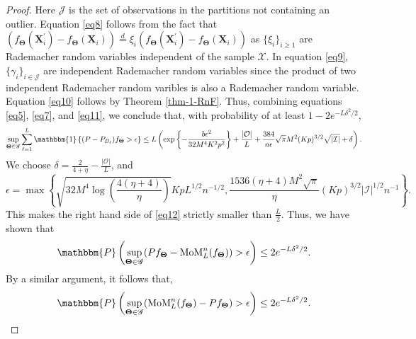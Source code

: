 \documentclass[11pt]{article}
\newcommand{\bX}{\boldsymbol{X}}
\newcommand{\bTheta}{\boldsymbol{\Theta}}
\newcommand{\I}{\mathcal{I}}
\newcommand{\J}{\mathcal{J}}
\newcommand{\cO}{\mathcal{O}}
\newcommand{\sP}{\mathbbm{P}}
\newcommand{\one}{\mathbbm{1}}
\begin{document}
\begin{proof}
Here $\J$ is the set of observations in the partitions not containing an outlier. Equation \eqref{eq8} follows from the fact that  $(f_{\bTheta}(\bX_i^\prime)-f_{\bTheta}(\bX_i)) \overset{d}{=} \xi_i(f_{\bTheta}(\bX_i^\prime)-f_{\bTheta}(\bX_i))$ as $\{\xi_i\}_{i\ge 1}$ are Rademacher random variables independent of the sample $\mathcal{X}$. In equation \eqref{eq9}, $\{\gamma_i\}_{i \in \mathcal{J}}$ are independent Rademacher random variables since the product of two independent Rademacher random varibles is also a Rademacher random variable. Equation \eqref{eq10} follows by Theorem \ref{thm-1-RnF}.
Thus, combining equations \eqref{eq5}, \eqref{eq7}, and \eqref{eq11}, we conclude that,  with probability of at least $1-2e^{-L \delta^2/2}$, 
\begin{equation}
    \sup_{\bTheta \in \mathscr{G}}\sum_{\ell = 1}^L \one\left\{(P-P_{B_\ell})f_{\bTheta} > \epsilon\right\} \le  L \left( \exp\left\{-\frac{b \epsilon^2}{32  M^4 K^2 p^2}\right\}+ \frac{|\cO|}{L} + \frac{384}{n \epsilon}  \sqrt{\pi} M^2  (Kp)^{3/2} \sqrt{|\I|} + \delta\right). \label{eq12}
\end{equation}
We choose $\delta = \frac{2}{4+\eta} - \frac{|\cO|}{L}$, and $$\epsilon = \max\left\{\sqrt{32  M^4 \log\left(\frac{4(\eta+4)}{\eta}\right)}KpL^{1/2}n^{-1/2}, \frac{1536(\eta+4)  M^2 \sqrt{\pi}}{\eta} (Kp)^{3/2} |\I|^{1/2}n^{-1}\right\}.$$ This makes the right hand side of \eqref{eq12} strictly smaller than $\frac{L}{2}$.
Thus, we have shown that 
\begin{align*}
     \sP\left( \sup_{\bTheta \in \mathscr{G}} (Pf_{\bTheta} - \text{MoM}^n_L (f_{\bTheta}))> \epsilon \right) \le 2e^{-L \delta^2/2}.
 \end{align*}
By a similar argument, it follows that,
\begin{align*}
    \sP\left( \sup_{\bTheta \in \mathscr{G}} (\text{MoM}^n_L (f_{\bTheta}) -Pf_{\bTheta} ) > \epsilon \right) \le 2e^{-L \delta^2/2}.
\end{align*}

\end{proof}
\end{document}
